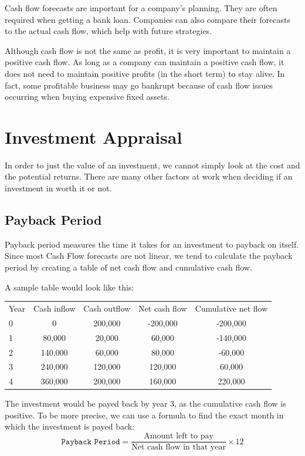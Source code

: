\documentclass{standalone}
\begin{document}
Cash flow forecasts are important for a company's planning.
They are often required when getting a bank loan.
Companies can also compare their forecasts to the actual cash flow, which help with future strategies.

Although cash flow is not the same as profit, it is very important to maintain a positive cash flow.
As long as a company can maintain a positive cash flow, it does not need to maintain positive profits (in the short term) to stay alive.
In fact, some profitable business may go bankrupt because of cash flow issues occurring when buying expensive fixed assets.

\section{Investment Appraisal}
In order to just the value of an investment, we cannot simply look at the cost and the potential returns.
There are many other factors at work when deciding if an investment in worth it or not.

\subsection{Payback Period}
Payback period measures the time it takes for an investment to payback on itself.
Since most Cash Flow forecasts are not linear, we tend to calculate the payback period by creating a table of net cash flow and cumulative cash flow.

A sample table would look like this:
\begin{tabular}{l c c c c}
    Year & Cash inflow & Cash outflow & Net cash flow & Cumulative net flow \\
    0    & 0           & 200,000      & -200,000      & -200,000 \\
    1    & 80,000      & 20,000       & 60,000        & -140,000 \\
    2    & 140,000     & 60,000       & 80,000        & -60,000 \\
    3    & 240,000     & 120,000      & 120,000       & 60,000 \\
    4    & 360,000     & 200,000      & 160,000       & 220,000 \\
\end{tabular}

The investment would be payed back by year 3, as the cumulative cash flow is positive.
To be more precise, we can use a formula to find the exact month in which the investment is payed back:
\begin{equation}
    \texttt{Payback Period} = \frac{\textrm{Amount left to pay}}{\textrm{Net cash flow in that year}} \times 12
\end{equation}
\end{document}
